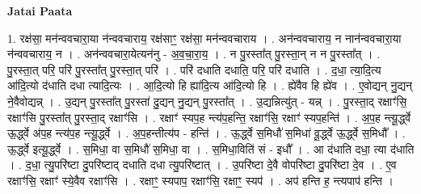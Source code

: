\documentclass[17pt]{extarticle}
\begin{document}
\textbf{Jatai Paata} \newline

1. रक्ष॑सा॒ मन॑न्ववचारा॒या न॑न्ववचाराय॒ रक्ष॑साꣳ॒॒ रक्ष॑सा॒ मन॑न्ववचाराय । . अन॑न्ववचाराय॒ न नान॑न्ववचारा॒या न॑न्ववचाराय॒ न । . अन॑न्ववचारा॒येत्यन॑नु - अ॒व॒चा॒रा॒य॒ । . न पु॒रस्ता᳚त् पु॒रस्ता॒न् न न पु॒रस्ता᳚त् । . पु॒रस्ता॒त् परि॒ परि॑ पु॒रस्ता᳚त् पु॒रस्ता॒त् परि॑ । . परि॑ दधाति दधाति॒ परि॒ परि॑ दधाति । . द॒धा॒ त्या॒दि॒त्य आ॑दि॒त्यो द॑धाति दधा त्यादि॒त्यः । . आ॒दि॒त्यो हि ह्या॑दि॒त्य आ॑दि॒त्यो हि । . ह्ये॑वैव हि ह्ये॑व । . ए॒वोद्यन् नु॒द्यन् ने॒वैवोद्यन्न् । . उ॒द्यन् पु॒रस्ता᳚त् पु॒रस्ता॑ दु॒द्यन् नु॒द्यन् पु॒रस्ता᳚त् । . उ॒द्यन्नित्यु॑त् - यन्न् । . पु॒रस्ता॒द् रक्षाꣳ॑सि॒ रक्षाꣳ॑सि पु॒रस्ता᳚त् पु॒रस्ता॒द् रक्षाꣳ॑सि । . रक्षाꣳ॑ स्यप॒ह न्त्य॑प॒हन्ति॒ रक्षाꣳ॑सि॒ रक्षाꣳ॑ स्यप॒हन्ति॑ । . अ॒प॒ह न्त्यू॒र्द्ध्वे ऊ॒र्द्ध्वे अ॑प॒ह न्त्य॑प॒ह न्त्यू॒र्द्ध्वे । . अ॒प॒हन्तीत्य॑प - हन्ति॑ । . ऊ॒र्द्ध्वे स॒मिधौ॑ स॒मिधा॑ वू॒र्द्ध्वे ऊ॒र्द्ध्वे स॒मिधौ᳚ । . ऊ॒र्द्ध्वे इत्यू॒र्द्ध्वे । . स॒मिधा॒ वा स॒मिधौ॑ स॒मिधा॒ वा । . स॒मिधा॒विति॑ सं - इधौ᳚ । . आ द॑धाति दधा॒ त्या द॑धाति । . द॒धा॒ त्यु॒परि॑ष्टा दु॒परि॑ष्टाद् दधाति दधा त्यु॒परि॑ष्टात् । . उ॒परि॑ष्टा दे॒वै वोपरि॑ष्टा दु॒परि॑ष्टा दे॒व । . ए॒व रक्षाꣳ॑सि॒ रक्षाꣳ॑ स्ये॒वैव रक्षाꣳ॑सि । . रक्षाꣳ॒॒ स्यपाप॒ रक्षाꣳ॑सि॒ रक्षाꣳ॒॒ स्यप॑ । . अप॑ हन्ति ह॒ न्त्यपाप॑ हन्ति । \newline
\end{document}
